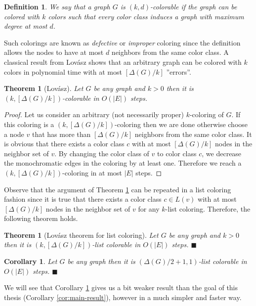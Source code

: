 \documentclass[a4paper, 12pt]{article}
\newtheorem{theo}[lem]{Theorem}
\newtheorem{defin}[lem]{Definition}
\newtheorem{corollary}[lem]{Corollary}
\begin{document}
\begin{defin} We say that a graph $G$ is $(k,d)$-colorable if the graph can be colored with $k$ colors such that every color class induces a graph with maximum degree at most $d$.
\end{defin}

Such colorings are known as \textit{defective} or \textit{improper} coloring since the definition allows the nodes to have at most $d$ neighbors from the same color class.
A classical result from Lovász shows that an arbitrary graph can be colored with $k$ colors in polynomial time with at most $[\Delta(G)/k]$ ''errors''.
\begin{theo}[Lovász]\label{theo:lovasz-defective}
Let $G$ be any graph and $k > 0$ then it is $(k,[\Delta(G)/k])$-colorable in $O(|E|)$ steps.
\end{theo}
\begin{proof} Let us consider an arbitrary (not necessarily proper) $k$-coloring of $G$. If this coloring is a $(k,[\Delta(G)/k])$-coloring then we are done otherwise choose a node $v$ that has more than $[\Delta(G)/k]$ neighbors from the same color class. It is obvious that there exists a color class $c$ with at most $[\Delta(G)/k]$ nodes in the neighbor set of $v$. By changing the color class of $v$ to color class $c$, we decrease the monochromatic edges in the coloring by at least one. Therefore we reach a $(k,[\Delta(G)/k])$-coloring in at most $|E|$ steps.
\end{proof}

Observe that the argument of Theorem \ref{theo:lovasz-defective} can be repeated in a list coloring fashion since it is true that there exists a color class $c \in L(v)$ with at most $[\Delta(G)/k]$ nodes in the neighbor set of $v$ for any $k$-list coloring. Therefore, the following theorem holds.

\begin{theo}[Lovász theorem for list coloring]Let $G$ be any graph and $k > 0$ then it is $(k,[\Delta(G)/k])$-list colorable in $O(|E|)$ steps. $\blacksquare$
\end{theo}

\begin{corollary}\label{cor:lovasz} Let $G$ be any graph then it is $(\Delta(G)/2 + 1,1)$-list colorable in $O(|E|)$ steps. $\blacksquare$
\end{corollary}

We will see that Corollary \ref{cor:lovasz} gives us a bit weaker result than the goal of this thesis (Corollary \ref{cor:main-result}), however in a much simpler and faster way.
\end{document}
